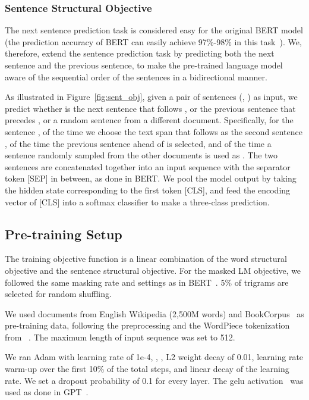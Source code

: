 \documentclass{article}
\begin{document}
\subsubsection{Sentence Structural Objective}
The next sentence prediction task is considered easy for the original BERT model (the prediction accuracy of BERT can easily achieve 97\%-98\% in this task~\cite{devlin2018bert}). We, therefore, extend the sentence prediction task by predicting both the next sentence and the previous sentence, to make the pre-trained language model aware of the sequential order of the sentences in a bidirectional manner.

As illustrated in Figure~\ref{fig:sent_obj}, given a pair of sentences (, ) as input, we predict whether  is the next sentence that follows , or the previous sentence that precedes , or a random sentence from a different document. Specifically, for the sentence ,  of the time we choose the text span that follows  as the second sentence ,  of the time the previous sentence ahead of  is selected, and  of the time a sentence randomly sampled from the other documents is used as . The two sentences are concatenated together into an input sequence with the separator token [SEP] in between, as done in BERT. We pool the model output by taking the hidden state corresponding to the first token [CLS], and feed the encoding vector of [CLS] into a softmax classifier to make a three-class prediction.

\subsection{Pre-training Setup}
The training objective function is a linear combination of the word structural objective and the sentence structural objective. For the masked LM objective, we followed the same masking rate and settings as in BERT~\cite{devlin2018bert}. 5\% of trigrams are selected for random shuffling.

We used documents from English Wikipedia (2,500M words) and BookCorpus~\cite{zhu2015aligning} as pre-training data, following the preprocessing and the WordPiece tokenization from ~\cite{devlin2018bert}. The maximum length of input sequence was set to 512.

We ran Adam with learning rate of 1e-4, , , L2 weight decay of 0.01, learning rate warm-up over the first 10\% of the total steps, and linear decay of the learning rate. We set a dropout probability of 0.1 for every layer. The gelu activation~\cite{hendrycks2016gaussian} was used as done in GPT~\cite{radford2018improving}.
\end{document}

